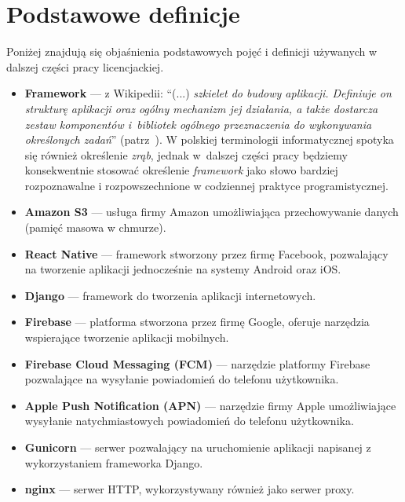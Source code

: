\documentclass[licencjacka]{pracamgr}
\begin{document}
\chapter{Podstawowe definicje}\label{r:definicje}

Poniżej znajdują się objaśnienia podstawowych pojęć i definicji używanych w dalszej części pracy licencjackiej.

\begin{itemize}
\setlength\itemsep{-0.2em}

\item \textbf{Framework} --- z Wikipedii: ``(...) \textit{szkielet do budowy aplikacji. Definiuje on strukturę aplikacji oraz ogólny mechanizm jej działania, a także dostarcza zestaw komponentów i~bibliotek ogólnego przeznaczenia do wykonywania określonych zadań}'' (patrz~\cite{framework}). W polskiej terminologii informatycznej spotyka się również określenie \textit{zrąb}, jednak w~dalszej części pracy będziemy konsekwentnie stosować określenie \textit{framework} jako słowo bardziej rozpoznawalne i rozpowszechnione w codziennej praktyce programistycznej.

\item \textbf{Amazon S3} --- usługa firmy Amazon umożliwiająca przechowywanie danych (pamięć masowa w chmurze).

\item \textbf{React Native} --- framework stworzony przez firmę Facebook, pozwalający na tworzenie
aplikacji jednocześnie na systemy Android oraz iOS.

\item \textbf{Django} --- framework do tworzenia aplikacji internetowych.

\item \textbf{Firebase} --- platforma stworzona przez firmę Google, oferuje narzędzia wspierające tworzenie aplikacji mobilnych.

\item \textbf{Firebase Cloud Messaging (FCM)} --- narzędzie platformy Firebase pozwalające na wysyłanie powiadomień do telefonu użytkownika.

\item \textbf{Apple Push Notification (APN)} --- narzędzie firmy Apple umożliwiające wysyłanie natychmiastowych powiadomień do telefonu użytkownika.

\item \textbf{Gunicorn} --- serwer pozwalający na uruchomienie aplikacji napisanej z wykorzystaniem frameworka Django.

\item \textbf{nginx} --- serwer HTTP, wykorzystywany również jako serwer proxy.


\end{itemize}
\end{document}
